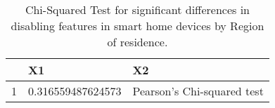 \begin{table}[ht]
\centering
\begin{tabular}{rll}
  \hline
 & X1 & X2 \\ 
  \hline
1 & 0.316559487624573 & Pearson's Chi-squared test \\ 
   \hline
\end{tabular}
\caption{Chi-Squared Test for significant differences in disabling features in smart home devices by Region of residence.} 
\end{table}

